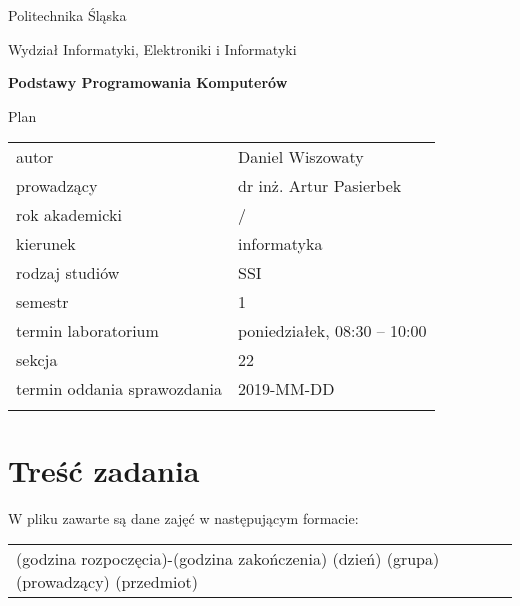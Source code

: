\documentclass[12pt,a4paper,twoside]{article}
\let\oldmarginpar\marginpar
\renewcommand\marginpar[1]{%
  {\linespread{0.85}\normalfont\scriptsize%
\oldmarginpar[\hspace{1cm}\begin{minipage}{3cm}\raggedleft\scriptsize\color{black}\textsf{#1}\end{minipage}]%
{\hspace{0cm}\begin{minipage}{3cm}\raggedright\scriptsize\color{black}\textsf{#1}\end{minipage}}%
}%
}
\newcounter{rok}
\newcommand{\rokakademicki}{%
   \setcounter{rok}{\number\year}%
   \ifthenelse{\number\month<10}%
   {\addtocounter{rok}{-1}}%
   {}%
   \arabic{rok}/\addtocounter{rok}{1}\arabic{rok}
}
\begin{document}
\frenchspacing
\thispagestyle{empty}
\begin{center}
{\Large\sf Politechnika Śląska   %

Wydział Informatyki, Elektroniki i Informatyki

}

\vfill

 

\vfill\vfill

{\Huge\sffamily\bfseries Podstawy Programowania Komputerów\par}  

\vfill\vfill

{\LARGE\sf Plan}   


\vfill \vfill\vfill\vfill






\begin{tabular}{ll}
	\toprule
	autor                       & Daniel Wiszowaty    \\
	prowadzący                  & dr inż. Artur Pasierbek  \\
	rok akademicki              & \rokakademicki         \\
	kierunek                    & informatyka            \\
	rodzaj studiów              & SSI                    \\
	semestr                     & 1                      \\
	termin laboratorium         & poniedziałek, 08:30 -- 10:00 \\
	sekcja                      & 22                     \\
	termin oddania sprawozdania & 2019-MM-DD             \\
	\bottomrule
	                            &
\end{tabular}

\end{center}

\cleardoublepage

\section{Treść zadania}
\marginpar{}
W pliku zawarte są dane zajęć w następującym formacie: \newline \newline
\begin{tabular}{ll}
\footnotesize
\centering (godzina rozpoczęcia)-(godzina zakończenia) (dzień) (grupa) (prowadzący) (przedmiot)
\end{tabular} \newline
\end{document}
